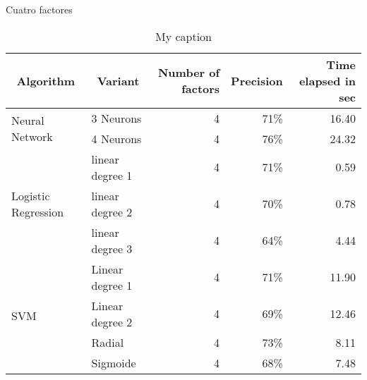 \documentclass[10pt,letterpaper,oneside]{article}
\begin{document}
Cuatro factores

\begin{table}[]
	\centering
	\caption{My caption}
	\label{efficiency-four-factors}
	\begin{tabular}{llrrr}
		\hline
		\multicolumn{1}{c}{\textbf{Algorithm}} & \multicolumn{1}{c}{\textbf{Variant}} & \multicolumn{1}{p{1.5cm}}{\textbf{Number of factors}} & \multicolumn{1}{c}{\textbf{Precision}} & \multicolumn{1}{p{1.5cm}}{\textbf{Time elapsed in sec}} \\ \hline
		\multirow{2}{*}{Neural Network}        & 3 Neurons                            & 4                                              & 71\%                                   & 16.40                                            \\
		& 4 Neurons                            & 4                                              & 76\%                                   & 24.32                                            \\
		\multirow{3}{*}{Logistic Regression}   & linear degree 1                      & 4                                              & 71\%                                   & 0.59                                             \\
		& linear degree 2                      & 4                                              & 70\%                                   & 0.78                                             \\
		& linear degree 3                      & 4                                              & 64\%                                   & 4.44                                             \\
		\multirow{4}{*}{SVM}                   & Linear degree 1                      & 4                                              & 71\%                                   & 11.90                                            \\
		& Linear degree 2                      & 4                                              & 69\%                                   & 12.46                                            \\
		& Radial                               & 4                                              & 73\%                                   & 8.11                                             \\
		& Sigmoide                             & 4                                              & 68\%                                   & 7.48                                             \\ \cline{2-5} 
	\end{tabular}
\end{table}
\end{document}
